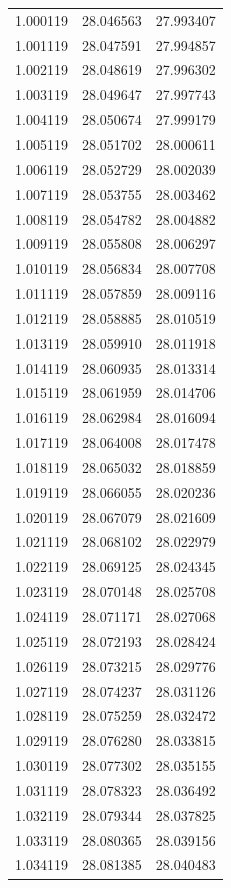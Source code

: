 \begin{tabular}{rrr}
1.000119 & 28.046563 & 27.993407 \\
1.001119 & 28.047591 & 27.994857 \\
1.002119 & 28.048619 & 27.996302 \\
1.003119 & 28.049647 & 27.997743 \\
1.004119 & 28.050674 & 27.999179 \\
1.005119 & 28.051702 & 28.000611 \\
1.006119 & 28.052729 & 28.002039 \\
1.007119 & 28.053755 & 28.003462 \\
1.008119 & 28.054782 & 28.004882 \\
1.009119 & 28.055808 & 28.006297 \\
1.010119 & 28.056834 & 28.007708 \\
1.011119 & 28.057859 & 28.009116 \\
1.012119 & 28.058885 & 28.010519 \\
1.013119 & 28.059910 & 28.011918 \\
1.014119 & 28.060935 & 28.013314 \\
1.015119 & 28.061959 & 28.014706 \\
1.016119 & 28.062984 & 28.016094 \\
1.017119 & 28.064008 & 28.017478 \\
1.018119 & 28.065032 & 28.018859 \\
1.019119 & 28.066055 & 28.020236 \\
1.020119 & 28.067079 & 28.021609 \\
1.021119 & 28.068102 & 28.022979 \\
1.022119 & 28.069125 & 28.024345 \\
1.023119 & 28.070148 & 28.025708 \\
1.024119 & 28.071171 & 28.027068 \\
1.025119 & 28.072193 & 28.028424 \\
1.026119 & 28.073215 & 28.029776 \\
1.027119 & 28.074237 & 28.031126 \\
1.028119 & 28.075259 & 28.032472 \\
1.029119 & 28.076280 & 28.033815 \\
1.030119 & 28.077302 & 28.035155 \\
1.031119 & 28.078323 & 28.036492 \\
1.032119 & 28.079344 & 28.037825 \\
1.033119 & 28.080365 & 28.039156 \\
1.034119 & 28.081385 & 28.040483 \\

\end{tabular}
